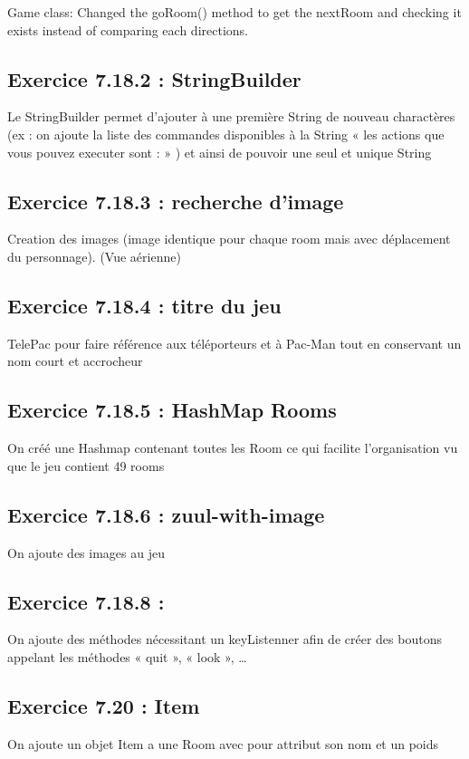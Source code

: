 \documentclass[twoside,french]{report}
\begin{document}
Game class:
Changed the goRoom() method to get the nextRoom and checking it exists instead of comparing each directions.



\subsection*{Exercice 7.18.2 : StringBuilder}
Le StringBuilder permet d’ajouter à une première String de nouveau charactères (ex : on ajoute la liste des commandes disponibles à la String « les actions que vous pouvez executer sont : » ) et ainsi de pouvoir une seul et unique String

\subsection*{Exercice 7.18.3 : recherche d’image}
Creation des images (image identique pour chaque room mais avec déplacement du personnage).
(Vue aérienne)

\subsection*{Exercice 7.18.4 : titre du jeu}
TelePac pour faire référence aux téléporteurs et à Pac-Man tout en conservant un nom court et accrocheur

\subsection*{Exercice 7.18.5 : HashMap Rooms}
On créé une Hashmap contenant toutes les Room ce qui facilite l’organisation vu que le jeu contient 49 rooms

\subsection*{Exercice 7.18.6 : zuul-with-image}
On ajoute des images au jeu
\subsection*{Exercice 7.18.8 :} 
On ajoute des méthodes nécessitant un keyListenner afin de créer des boutons appelant les méthodes « quit », « look », …
\subsection*{Exercice 7.20 : Item}
On ajoute un objet Item a une Room avec pour attribut son nom et un poids 
\end{document}
